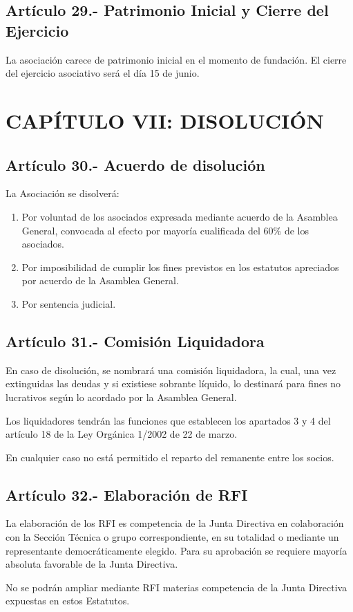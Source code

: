 \documentclass[12pt]{article}
\begin{document}
\subsection{Artículo 29.- Patrimonio Inicial y Cierre del Ejercicio}
La asociación carece de patrimonio inicial en el momento de fundación. El cierre del ejercicio asociativo será el día 15 de junio.


\section{CAPÍTULO VII: DISOLUCIÓN}


\subsection{Artículo 30.- Acuerdo de disolución}
La Asociación se disolverá:
\begin{enumerate}[label=\alph*)]
    \item Por voluntad de los asociados expresada mediante acuerdo de la Asamblea General, convocada al efecto por mayoría cualificada del 60\% de los asociados.
    \item Por imposibilidad de cumplir los fines previstos en los estatutos apreciados por acuerdo de la Asamblea General.
    \item Por sentencia judicial.
\end{enumerate}

\subsection{Artículo 31.- Comisión Liquidadora}
En caso de disolución, se nombrará una comisión liquidadora, la cual, una vez extinguidas las deudas y si existiese sobrante líquido, lo destinará para fines no lucrativos según lo acordado por la Asamblea General.

Los liquidadores tendrán las funciones que establecen los apartados 3 y 4 del artículo 18 de la Ley Orgánica 1/2002 de 22 de marzo.

En cualquier caso no está permitido el reparto del remanente entre los socios.

\subsection{Artículo 32.- Elaboración de RFI}
La elaboración de los RFI es competencia de la Junta Directiva en colaboración con la Sección Técnica o grupo correspondiente, en su totalidad o mediante un representante democráticamente elegido.
Para su aprobación se requiere mayoría absoluta favorable de la Junta Directiva.

No se podrán ampliar mediante RFI materias competencia de la Junta Directiva expuestas en estos Estatutos.
\end{document}

